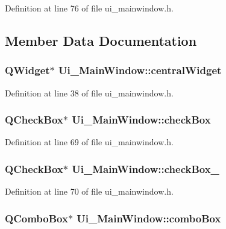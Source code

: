Definition at line 76 of file ui\-\_\-mainwindow.\-h.



\subsection{Member Data Documentation}
\hypertarget{class_ui___main_window_a30075506c2116c3ed4ff25e07ae75f81}{
\subsubsection[{central\-Widget}]{\setlength{\rightskip}{0pt plus 5cm}Q\-Widget$\ast$ Ui\-\_\-\-Main\-Window\-::central\-Widget}}\label{class_ui___main_window_a30075506c2116c3ed4ff25e07ae75f81}


Definition at line 38 of file ui\-\_\-mainwindow.\-h.

\hypertarget{class_ui___main_window_ae8154204ed56489a091cf3a81af1f996}{
\subsubsection[{check\-Box}]{\setlength{\rightskip}{0pt plus 5cm}Q\-Check\-Box$\ast$ Ui\-\_\-\-Main\-Window\-::check\-Box}}\label{class_ui___main_window_ae8154204ed56489a091cf3a81af1f996}


Definition at line 69 of file ui\-\_\-mainwindow.\-h.

\hypertarget{class_ui___main_window_a42f54d4275ffecc52ea117a43a2a4def}{
\subsubsection[{check\-Box\-\_\-2}]{\setlength{\rightskip}{0pt plus 5cm}Q\-Check\-Box$\ast$ Ui\-\_\-\-Main\-Window\-::check\-Box\-\_}}\label{class_ui___main_window_a42f54d4275ffecc52ea117a43a2a4def}


Definition at line 70 of file ui\-\_\-mainwindow.\-h.

\hypertarget{class_ui___main_window_af4df84479fcdbcc4c6d2d3e39046317a}{
\subsubsection[{combo\-Box}]{\setlength{\rightskip}{0pt plus 5cm}Q\-Combo\-Box$\ast$ Ui\-\_\-\-Main\-Window\-::combo\-Box}}\label{class_ui___main_window_af4df84479fcdbcc4c6d2d3e39046317a}


